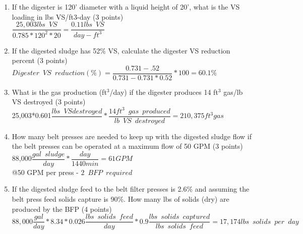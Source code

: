 \begin{enumerate}
\begin{enumerate}
\item If the digester is 120’ diameter with a liquid height of 20’, what is the VS loading in lbs VS/ft3-day (3 points)\\

$\dfrac{25,003 lbs \enspace VS}{0.785*120^2*20}=\boxed{\dfrac{0.11 lbs \enspace VS}{day-ft^3}}$\\
\vspace{2cm}





\item If the digested sludge has 52\% VS, calculate the digester VS reduction percent (3 points)\\

$
Digester \enspace VS \enspace reduction (\%)=
	\dfrac
	{0.731 - .52}
	{0.731 - 0.731 *0.52}
	*100=\boxed{60.1\%}
$\\
\vspace{2cm}

\item What is the gas production (ft$^3$/day) if the digester produces 14 ft$^3$ gas/lb VS destroyed (3 points)\\
25,003*0.601$\dfrac{lbs\enspace VS destroyed}{}*\dfrac{14ft^3 \enspace gas \enspace produced}{lb \enspace VS \enspace destroyed}=\boxed{210,375ft^3 gas}$
\\
\vspace{2cm}

\item How many belt presses are needed to keep up with the digested sludge flow if the belt presses can be operated at a maximum flow of 50 GPM (3 points)\\

88,000$\dfrac{gal \enspace sludge}{day}*\dfrac{day}{1440min}=61 GPM$\\
@50 GPM per press - $\boxed{2 \enspace BFP \enspace required}$
\vspace{2cm}
\item If the digested sludge feed to the belt filter presses is 2.6\% and assuming the belt press feed solids capture is 90\%.  How many lbs of solids (dry) are produced by the BFP (4 points)\\
$88,000\dfrac{gal}{day}*8.34*0.026\dfrac{lbs \enspace solids \enspace feed}{day}*0.9\dfrac{lbs \enspace solids \enspace captured}{lbs \enspace solids \enspace feed}=\boxed{17,174 lbs \enspace solids \enspace per \enspace day}$
\vspace{2cm}


\end{enumerate}
\end{enumerate}
